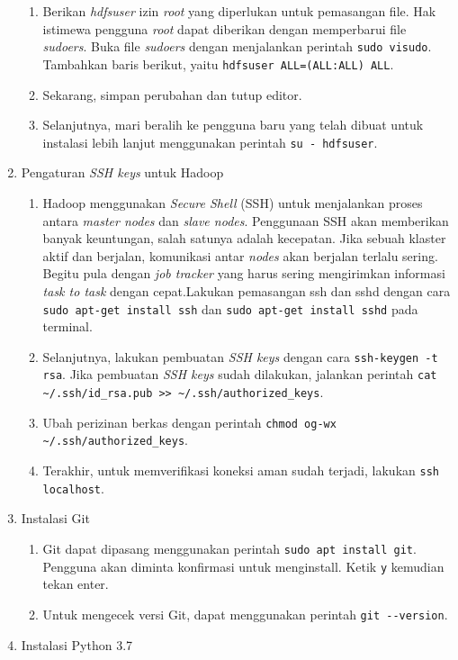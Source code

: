 \begin{enumerate}
\begin{enumerate}
    \item Berikan \textit{hdfsuser} izin \textit{root} yang diperlukan untuk pemasangan file. Hak istimewa pengguna \textit{root} dapat diberikan dengan memperbarui file \textit{sudoers}. Buka file \textit{sudoers} dengan menjalankan perintah \verb|sudo visudo|. Tambahkan baris berikut, yaitu \verb|hdfsuser ALL=(ALL:ALL) ALL|.
    \item Sekarang, simpan perubahan dan tutup editor.
    \item Selanjutnya, mari beralih ke pengguna baru yang telah dibuat untuk instalasi lebih lanjut menggunakan perintah \verb|su - hdfsuser|.
  \end{enumerate}
  \item Pengaturan \textit{SSH keys} untuk Hadoop
  \begin{enumerate}
  	\item Hadoop menggunakan \textit{Secure Shell} (SSH) untuk menjalankan proses antara \textit{master nodes} dan \textit{slave nodes}. Penggunaan SSH akan memberikan banyak keuntungan, salah satunya adalah kecepatan. Jika sebuah klaster aktif dan berjalan, komunikasi antar \textit{nodes} akan berjalan terlalu sering. Begitu pula dengan \textit{job tracker} yang harus sering mengirimkan informasi \textit{task to task} dengan cepat.Lakukan pemasangan ssh dan sshd dengan cara \verb|sudo apt-get install ssh| dan \verb|sudo apt-get install sshd| pada terminal.
    \item Selanjutnya, lakukan pembuatan \textit{SSH keys} dengan cara \verb|ssh-keygen -t rsa|. Jika pembuatan \textit{SSH keys} sudah dilakukan, jalankan perintah \verb|cat ~/.ssh/id_rsa.pub >> ~/.ssh/authorized_keys|.
    \item Ubah perizinan berkas dengan perintah \verb|chmod og-wx ~/.ssh/authorized_keys|.
    \item Terakhir, untuk memverifikasi koneksi aman sudah terjadi, lakukan \verb|ssh localhost|.
  \end{enumerate}
  \item Instalasi Git
  \begin{enumerate}
    \item Git dapat dipasang menggunakan perintah \verb|sudo apt install git|. Pengguna akan diminta konfirmasi untuk menginstall. Ketik \verb|y| kemudian tekan enter.
    \item Untuk mengecek versi Git, dapat menggunakan perintah \verb|git --version|.
  \end{enumerate}
  \item Instalasi Python 3.7

\end{enumerate}
